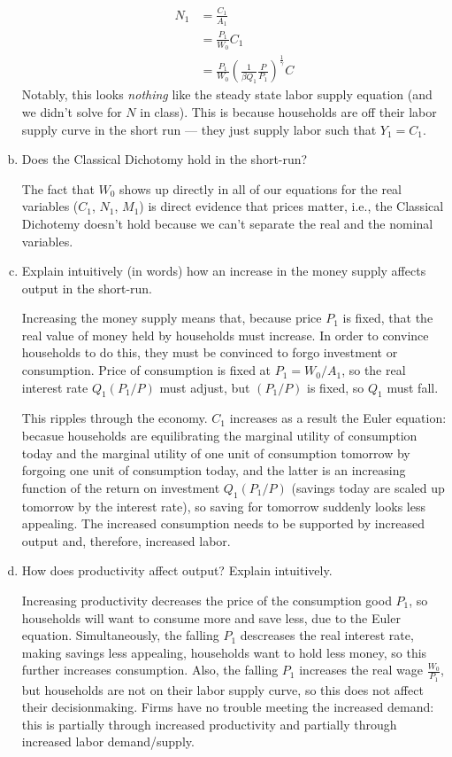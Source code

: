 \documentclass[answers]{exam}
\newcommand{\1}{\mathbf{1}}
\begin{document}
\begin{enumerate}[(a)]
\begin{solution}
        \begin{align*}
            N_1 & = \frac{C_1}{A_1} \\
            & = \frac{P_1}{W_0} C_1 \\
            &=\frac{P_1}{W_0} \left(\frac{1}{\beta Q_1} \frac{P}{P_1}\right)^{\frac{1}{\gamma}} C
        \end{align*}
        Notably, this looks \textit{nothing} like the steady state labor supply equation (and we didn't solve for $N$ in class). This is because households are off their labor supply curve in the short run --- they just supply labor such that $Y_1 = C_1$.
    \end{solution}
	\item Does the Classical Dichotomy hold in the short-run? 
	\begin{solution}
        The fact that $W_0$ shows up directly in all of our equations for the real variables ($C_1$, $N_1$, $M_1$) is direct evidence that prices matter, i.e., the Classical Dichotemy doesn't hold because we can't separate the real and the nominal variables.
    \end{solution}
	\item Explain intuitively (in words) how an increase in the money supply affects output in the short-run.
	\begin{solution}
        Increasing the money supply means that, because price $P_1$ is fixed, that the real value of money held by households must increase. In order to convince households to do this, they must be convinced to forgo investment or consumption. Price of consumption is fixed at $P_1 = W_0 / A_1$, so the real interest rate $Q_1 (P_1 / P)$ must adjust, but $(P_1 / P)$ is fixed, so $Q_1$ must fall.
        
        This ripples through the economy. $C_1$ increases as a result the Euler equation: becasue households are equilibrating the marginal utility of consumption today and the marginal utility of one unit of consumption tomorrow by forgoing one unit of consumption today, and the latter is an increasing function of the return on investment $Q_1(P_1 / P)$ (savings today are scaled up tomorrow by the interest rate), so saving for tomorrow suddenly looks less appealing. The increased consumption needs to be supported by increased output and, therefore, increased labor.
    \end{solution}
	\item How does productivity affect output? Explain intuitively.
	\begin{solution}
        Increasing productivity decreases the price of the consumption good $P_1$, so households will want to consume more and save less, due to the Euler equation. Simultaneously, the falling $P_1$ descreases the real interest rate, making savings less appealing, households want to hold less money, so this further increases consumption. Also, the falling $P_1$ increases the real wage $\frac{W_0}{P_1}$, but households are not on their labor supply curve, so this does not affect their decisionmaking. Firms have no trouble meeting the increased demand: this is partially through increased productivity and partially through increased labor demand/supply.
        

\end{solution}
\end{enumerate}
\end{document}
